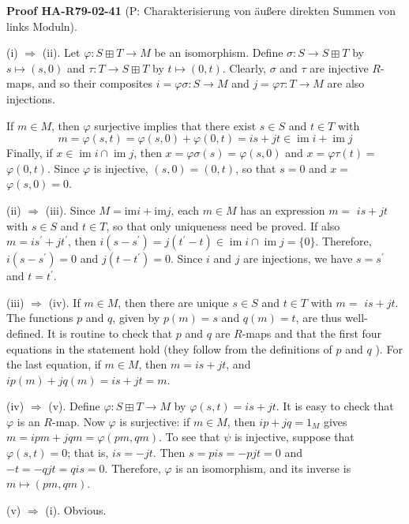 \documentclass[10pt, letterpaper]{article}
\newcommand{\CustomHeading}[3]{%
  \par\medskip\noindent%
  \textbf{#1 #2} \textnormal{(#3)}.\enskip%
}
\newenvironment{PROOF}[2]{\begin{unitbox}\CustomHeading{Proof}{#1}{#2}}{\end{unitbox}}
\begin{document}
\begin{PROOF}{HA-R79-02-41}{P: Charakterisierung von äußere direkten Summen von links Moduln}
(i) $\Rightarrow$ (ii). Let $\varphi: S \boxplus T \rightarrow M$ be an isomorphism. Define $\sigma: S \rightarrow S \boxplus T$ by $s \mapsto(s, 0)$ and $\tau: T \rightarrow S \boxplus T$ by $t \mapsto(0, t)$. Clearly, $\sigma$ and $\tau$ are injective $R$-maps, and so their composites $i=\varphi \sigma: S \rightarrow M$ and $j=\varphi \tau: T \rightarrow M$ are also injections.

If $m \in M$, then $\varphi$ surjective implies that there exist $s \in S$ and $t \in T$ with
$$
m=\varphi(s, t)=\varphi(s, 0)+\varphi(0, t)=i s+j t \in \operatorname{im} i+\operatorname{im} j
$$
Finally, if $x \in \operatorname{im} i \cap \operatorname{im} j$, then $x=\varphi \sigma(s)=\varphi(s, 0)$ and $x=\varphi \tau(t)=$ $\varphi(0, t)$. Since $\varphi$ is injective, $(s, 0)=(0, t)$, so that $s=0$ and $x=$ $\varphi(s, 0)=0$.


(ii) $\Rightarrow$ (iii). Since $M=\mathrm{im} i+\mathrm{im} j$, each $m \in M$ has an expression $m=$ $i s+j t$ with $s \in S$ and $t \in T$, so that only uniqueness need be proved. If also $m=i s^{\prime}+j t^{\prime}$, then $i\left(s-s^{\prime}\right)=j\left(t^{\prime}-t\right) \in \operatorname{im} i \cap \operatorname{im} j=\{0\}$. Therefore, $i\left(s-s^{\prime}\right)=0$ and $j\left(t-t^{\prime}\right)=0$. Since $i$ and $j$ are injections, we have $s=s^{\prime}$ and $t=t^{\prime}$.


(iii) $\Rightarrow$ (iv). If $m \in M$, then there are unique $s \in S$ and $t \in T$ with $m=$ $i s+j t$. The functions $p$ and $q$, given by $p(m)=s$ and $q(m)=t$, are thus well-defined. It is routine to check that $p$ and $q$ are $R$-maps and that the first four equations in the statement hold (they follow from the definitions of $p$ and $q$ ). For the last equation, if $m \in M$, then $m=i s+j t$, and $i p(m)+j q(m)=i s+j t=m$.


(iv) $\Rightarrow$ (v). Define $\varphi: S \boxplus T \rightarrow M$ by $\varphi(s, t)=i s+j t$. It is easy to check that $\varphi$ is an $R$-map. Now $\varphi$ is surjective: if $m \in M$, then $i p+j q=1_{M}$ gives $m=i p m+j q m=\varphi(p m, q m)$. To see that $\psi$ is injective, suppose that $\varphi(s, t)=0$; that is, $i s=-j t$. Then $s=p i s=-p j t=0$ and $-t=-q j t=q i s=0$. Therefore, $\varphi$ is an isomorphism, and its inverse is $m \mapsto(p m, q m)$.


(v) $\Rightarrow$ (i). Obvious.
\end{PROOF}
\end{document}
